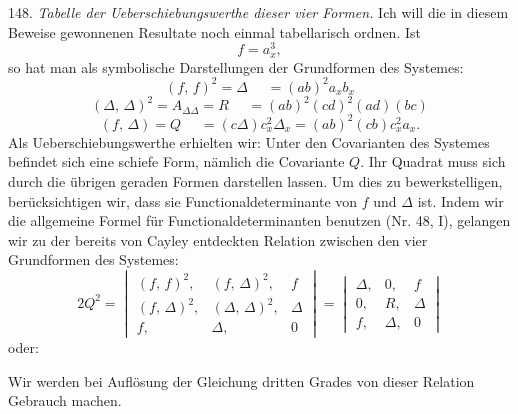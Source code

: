 148. \textit{Tabelle der Ueberschiebungswerthe dieser vier Formen.} Ich will die in diesem Beweise gewonnenen Resultate noch einmal tabellarisch ordnen. Ist
\[
f = a_x^3,
\]
so hat man als symbolische Darstellungen der Grundformen des Systemes:
\[
(f,\,f)^2 = \Delta \phantom{{}={}} = (ab)^2 a_x b_x
\]
\[
(\Delta,\,\Delta)^2 = A_{\Delta\Delta} = R \phantom{{}={}} = (ab)^2(cd)^2(ad)(bc)
\]
\[
(f,\,\Delta) = Q \phantom{{}={}} = (c\Delta)c_x^2 \Delta_x = (ab)^2(cb)c_x^2 a_x.
\]
Als Ueberschiebungswerthe erhielten wir:
Unter den Covarianten des Systemes befindet sich eine schiefe Form, nämlich die Covariante $Q$. Ihr Quadrat muss sich durch die übrigen geraden Formen darstellen lassen. Um dies zu bewerkstelligen, berücksichtigen wir, dass sie Functionaldeterminante von $f$ und $\Delta$ ist. Indem wir die allgemeine Formel für Functionaldeterminanten benutzen (Nr. 48, I), gelangen wir zu der bereits von Cayley entdeckten Relation zwischen den vier Grundformen des Systemes:
\[
2Q^2 =
\begin{vmatrix}
(f,\,f)^2, & (f,\,\Delta)^2, & f \\
(f,\,\Delta)^2, & (\Delta,\,\Delta)^2, & \Delta \\
f, & \Delta, & 0
\end{vmatrix}
=
\begin{vmatrix}
\Delta, & 0, & f \\
0, & R, & \Delta \\
f, & \Delta, & 0
\end{vmatrix}
\]
oder:


Wir werden bei Auflösung der Gleichung dritten Grades von dieser Relation Gebrauch machen.

